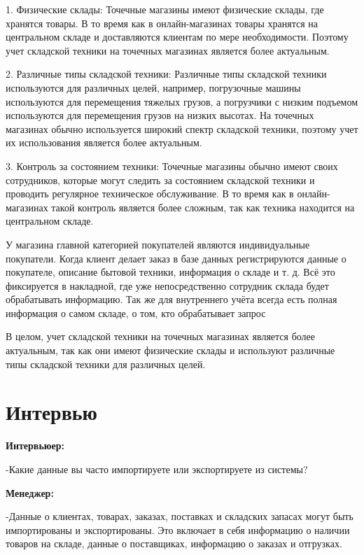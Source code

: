 \documentclass[14pt]{extreport}
\begin{document}
1. Физические склады: Точечные магазины имеют физические склады, где хранятся товары. В то время как в онлайн-магазинах товары хранятся на центральном складе и доставляются клиентам по мере необходимости. Поэтому учет складской техники на точечных магазинах является более актуальным.

2. Различные типы складской техники: Различные типы складской техники используются для различных целей, например, погрузочные машины используются для перемещения тяжелых грузов, а погрузчики с низким подъемом используются для перемещения грузов на низких высотах. На точечных магазинах обычно используется широкий спектр складской техники, поэтому учет их использования является более актуальным.

3. Контроль за состоянием техники: Точечные магазины обычно имеют своих сотрудников, которые могут следить за состоянием складской техники и проводить регулярное техническое обслуживание. В то время как в онлайн-магазинах такой контроль является более сложным, так как техника находится на центральном складе.

У магазина главной категорией покупателей являются индивидуальные покупатели.
Когда клиент делает заказ в базе данных регистрируются данные о покупателе, описание бытовой техники, информация о складе и т. д. Всё это фиксируется в накладной, где уже непосредственно сотрудник склада будет обрабатывать информацию. Так же для внутреннего учёта всегда есть полная информация о самом складе, о том, кто обрабатывает запрос

В целом, учет складской техники на точечных магазинах является более актуальным, так как они имеют физические склады и используют различные типы складской техники для различных целей.



\newpage
\section{Интервью}

\textbf{Интервьюер:}

-Какие данные вы часто импортируете или экспортируете из системы?

\textbf{Менеджер:}

-Данные о клиентах, товарах, заказах, поставках и складских запасах могут быть импортированы и экспортированы. Это включает в себя информацию о наличии товаров на складе, данные о поставщиках, информацию о заказах и отгрузках. 
\end{document}

